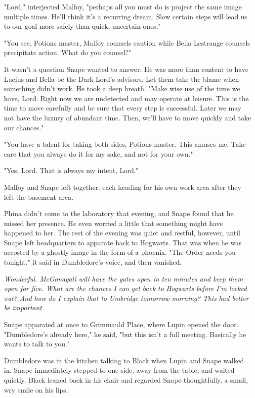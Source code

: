 \documentclass[a4paper,11pt]{article}
\begin{document}
"Lord," interjected Malfoy, "perhaps all you must do is project the same image multiple times. He'll think it's a recurring dream. Slow certain steps will lead us to our goal more safely than quick, uncertain ones."

"You see, Potions master, Malfoy counsels caution while Bella Lestrange counsels precipitate action. What do you counsel?"

It wasn't a question Snape wanted to answer. He was more than content to have Lucius and Bella be the Dark Lord's advisors. Let them take the blame when something didn't work. He took a deep breath. "Make wise use of the time we have, Lord. Right now we are undetected and may operate at leisure. This is the time to move carefully and be sure that every step is successful. Later we may not have the luxury of abundant time. Then, we'll have to move quickly and take our chances."

"You have a talent for taking both sides, Potions master. This amuses me. Take care that you always do it for my sake, and not for your own."

"Yes, Lord. That is always my intent, Lord."

Malfoy and Snape left together, each heading for his own work area after they left the basement area.

Phina didn't come to the laboratory that evening, and Snape found that he missed her presence. He even worried a little that something might have happened to her. The rest of the evening was quiet and restful, however, until Snape left headquarters to apparate back to Hogwarts. That was when he was accosted by a ghostly image in the form of a phoenix. "The Order needs you tonight," it said in Dumbledore's voice, and then vanished.

\emph{Wonderful. McGonagall will have the gates open in ten minutes and keep them open for five. What are the chances I can get back to Hogwarts before I'm locked out? And how do I explain that to Umbridge tomorrow morning? This had better be important.}

Snape apparated at once to Grimmauld Place, where Lupin opened the door. "Dumbledore's already here," he said, "but this isn't a full meeting. Basically he wants to talk to you."

Dumbledore was in the kitchen talking to Black when Lupin and Snape walked in. Snape immediately stepped to one side, away from the table, and waited quietly. Black leaned back in his chair and regarded Snape thoughtfully, a small, wry smile on his lips.
\end{document}
